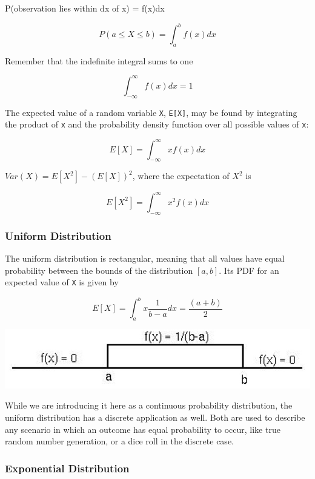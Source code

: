 \documentclass[
]{book}
\begin{document}
P(observation lies within dx of x) = f(x)dx

\[P(a\leq X \leq b) = \int_{a}^{b} f(x) dx\]

Remember that the indefinite integral sums to one

\[\int_{-\infty}^{\infty} f(x) dx = 1\]

The expected value of a random variable \texttt{X}, \texttt{E{[}X{]}}, may be found by integrating the product of \texttt{x} and the probability density function over all possible values of \texttt{x}:

\[E[X] = \int_{-\infty}^{\infty} xf(x) dx \]

\(Var(X) = E[X^2] - (E[X])^2\), where the expectation of \(X^2\) is

\[E[X^2] = \int_{-\infty}^{\infty} x^2f(x) dx \]

\hypertarget{uniform-distribution}{%
\subsubsection{\texorpdfstring{\textbf{Uniform Distribution}}{Uniform Distribution}}\label{uniform-distribution}}

The uniform distribution is rectangular, meaning that all values have equal probability between the bounds of the distribution \([a,b]\). Its PDF for an expected value of \texttt{X} is given by

\[E[X] = \int_{a}^{b} x\frac{1}{b-a} dx = \frac{(a+b)}{2} \]

\begin{center}\includegraphics[width=1\linewidth]{images/prob.019} \end{center}

While we are introducing it here as a continuous probability distribution, the uniform distribution has a discrete application as well. Both are used to describe any scenario in which an outcome has equal probability to occur, like true random number generation, or a dice roll in the discrete case.

\hypertarget{exponential-distribution}{%
\subsubsection{\texorpdfstring{\textbf{Exponential Distribution}}{Exponential Distribution}}\label{exponential-distribution}}
\end{document}

